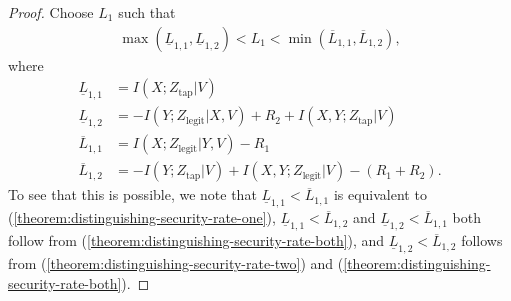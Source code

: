 \documentclass[journal]{IEEEtran}
\newcommand{\codebookRateOne}{R_1}
\newcommand{\codebookRateTwo}{R_2}
\newcommand{\channelInOne}{X}
\newcommand{\channelInTwo}{Y}
\newcommand{\channelOut}{Z}
\newcommand{\channelOutWiretapper}{\channelOut_\mathrm{tap}}
\newcommand{\channelOutLegit}{\channelOut_\mathrm{legit}}
\newcommand{\mutualInformationConditional}[3]{I(#1;#2|#3)}
\newcommand{\codebookRandRateOne}{{L_1}}
\newcommand{\codebookRandRateOneLower}[1]{{\underline{L}_{1,{#1}}}}
\newcommand{\codebookRandRateOneUpper}[1]{{\overline{L}_{1,{#1}}}}
\newcommand{\timeSharingRV}{V}
\begin{document}
\begin{proof}
Choose $\codebookRandRateOne$ such that
\begin{align}
\label{theorem:distinguishing-security-randrate-choice-one}
\max(\codebookRandRateOneLower{1}, \codebookRandRateOneLower{2})
< \codebookRandRateOne <
\min(\codebookRandRateOneUpper{1}, \codebookRandRateOneUpper{2}),
\end{align}
where
\begin{align*}
\codebookRandRateOneLower{1} &= \mutualInformationConditional{\channelInOne}{\channelOutWiretapper}{\timeSharingRV}
\\
\codebookRandRateOneLower{2}
&=
-\mutualInformationConditional{\channelInTwo}{\channelOutLegit}{\channelInOne,\timeSharingRV} + \codebookRateTwo + \mutualInformationConditional{\channelInOne,\channelInTwo}{\channelOutWiretapper}{\timeSharingRV}
\\
\codebookRandRateOneUpper{1} &= \mutualInformationConditional{\channelInOne}{\channelOutLegit}{\channelInTwo,\timeSharingRV} - \codebookRateOne
\\
\codebookRandRateOneUpper{2}
&=
-\mutualInformationConditional{\channelInTwo}{\channelOutWiretapper}{\timeSharingRV} + \mutualInformationConditional{\channelInOne,\channelInTwo}{\channelOutLegit}{\timeSharingRV} - (\codebookRateOne + \codebookRateTwo).
\end{align*}
To see that this is possible, we note that $\codebookRandRateOneLower{1} < \codebookRandRateOneUpper{1}$ is equivalent to (\ref{theorem:distinguishing-security-rate-one}), $\codebookRandRateOneLower{1} < \codebookRandRateOneUpper{2}$ and $\codebookRandRateOneLower{2} < \codebookRandRateOneUpper{1}$ both follow from (\ref{theorem:distinguishing-security-rate-both}), and $\codebookRandRateOneLower{2} < \codebookRandRateOneUpper{2}$ follows from (\ref{theorem:distinguishing-security-rate-two}) and (\ref{theorem:distinguishing-security-rate-both}).


\end{proof}
\end{document}
